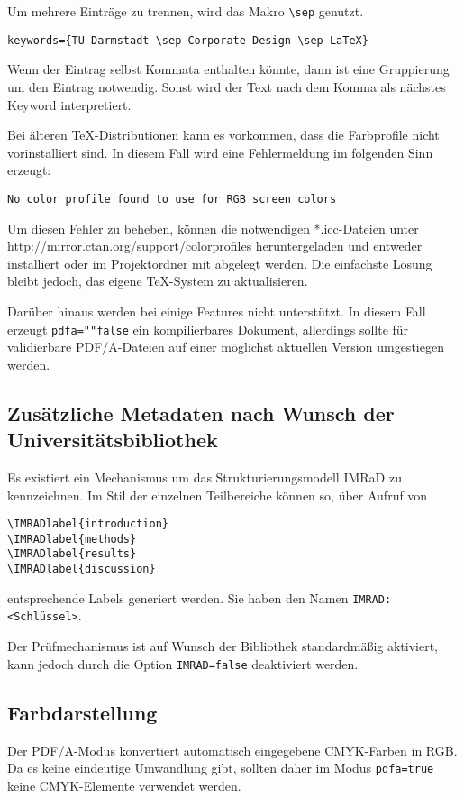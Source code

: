 \documentclass[
	ngerman,
	accentcolor=9c,%
	]{tudapub}
\let\code\texttt
\begin{document}
Um mehrere Einträge zu trennen, wird das Makro \code{\textbackslash{}sep} genutzt.
\begin{verbatim}
keywords={TU Darmstadt \sep Corporate Design \sep LaTeX}
\end{verbatim}
Wenn der Eintrag selbst Kommata enthalten könnte, dann ist eine Gruppierung um den Eintrag notwendig. Sonst wird der Text nach dem Komma als nächstes Keyword interpretiert.


Bei älteren \TeX-Distributionen kann es vorkommen, dass die Farbprofile nicht vorinstalliert sind. In diesem Fall wird eine Fehlermeldung im folgenden Sinn erzeugt:
\begin{verbatim}
No color profile found to use for RGB screen colors
\end{verbatim}
Um diesen Fehler zu beheben, können die notwendigen *.icc-Dateien unter \url{http://mirror.ctan.org/support/colorprofiles} heruntergeladen und entweder installiert oder im Projektordner mit abgelegt werden. Die einfachste Lösung bleibt jedoch, das eigene \TeX-System zu aktualisieren.

Darüber hinaus werden bei  einige Features nicht unterstützt. In diesem Fall erzeugt \code{pdfa=""false} ein kompilierbares Dokument, allerdings sollte für validierbare PDF/A-Dateien auf  einer möglichst aktuellen Version umgestiegen werden.

\subsection{Zusätzliche Metadaten nach Wunsch der Universitätsbibliothek}
\label{sec:IMRAD}
Es existiert ein Mechanismus um das Strukturierungsmodell IMRaD \cite{imrad} zu kennzeichnen.
Im Stil der einzelnen Teilbereiche können so, über Aufruf von

\begin{verbatim}
\IMRADlabel{introduction}
\IMRADlabel{methods}
\IMRADlabel{results}
\IMRADlabel{discussion}
\end{verbatim}
entsprechende Labels generiert werden. Sie haben den Namen \code{IMRAD:<Schlüssel>}.

Der Prüfmechanismus ist auf Wunsch der Bibliothek standardmäßig aktiviert, kann jedoch durch die Option \code{IMRAD=false} deaktiviert werden.

\subsection{Farbdarstellung}
\label{sec:pdfa-color}
Der PDF/A-Modus konvertiert automatisch eingegebene CMYK-Farben in RGB. Da es keine eindeutige Umwandlung gibt, sollten daher im Modus \code{pdfa=true} keine CMYK-Elemente verwendet werden.
\end{document}

